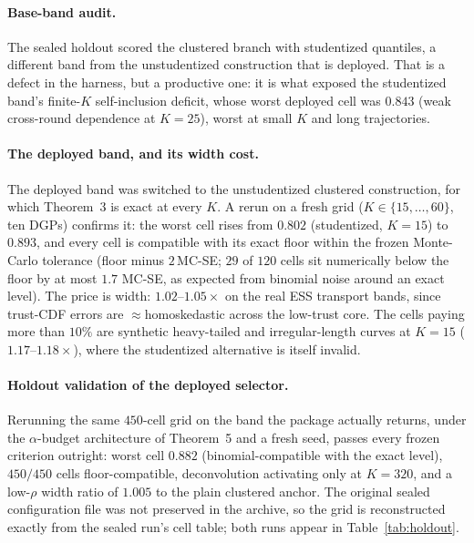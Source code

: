 \documentclass[12pt]{article}
\theoremstyle{definition}
\theoremstyle{remark}
\begin{document}
\paragraph{Base-band audit.}
The sealed holdout scored the clustered branch with studentized
quantiles,
a different band from the unstudentized construction that is deployed. That is a
defect in the harness, but a productive one: it is what exposed the
studentized band's finite-$K$ self-inclusion deficit, whose worst deployed
cell was $0.843$ (weak cross-round dependence at $K{=}25$), worst at small
$K$ and long trajectories.

\paragraph{The deployed band, and its width cost.} The deployed band was switched to the
unstudentized clustered construction, for which Theorem~3 is exact at every
$K$. A rerun on a fresh grid ($K\in\{15,\dots,60\}$, ten DGPs) confirms it:
the worst cell rises from $0.802$ (studentized, $K{=}15$) to $0.893$, and every cell is
compatible with its exact floor within the frozen Monte-Carlo tolerance
(floor minus $2\,$MC-SE; $29$ of $120$ cells sit numerically below the floor
by at most $1.7$ MC-SE, as expected from binomial noise around an exact
level). The price is width: $1.02$--$1.05\times$ on the real ESS transport
bands, since trust-CDF errors are $\approx$homoskedastic across the low-trust
core. The cells paying more than $10\%$ are synthetic heavy-tailed and
irregular-length curves at $K{=}15$ ($1.17$--$1.18\times$), where the
studentized alternative is itself invalid.

\paragraph{Holdout validation of the deployed selector.} Rerunning the same $450$-cell grid on the band
the package actually returns, under the $\alpha$-budget architecture of
Theorem~5 and a fresh seed, passes every frozen criterion outright: worst
cell $0.882$ (binomial-compatible with the exact level), $450/450$ cells
floor-compatible, deconvolution activating only at $K{=}320$, and a
low-$\rho$ width ratio of $1.005$ to the plain clustered anchor. The original sealed
configuration file was not preserved in the archive, so the grid is
reconstructed exactly from the sealed run's cell table; both runs appear in
Table~\ref{tab:holdout}.
\end{document}
